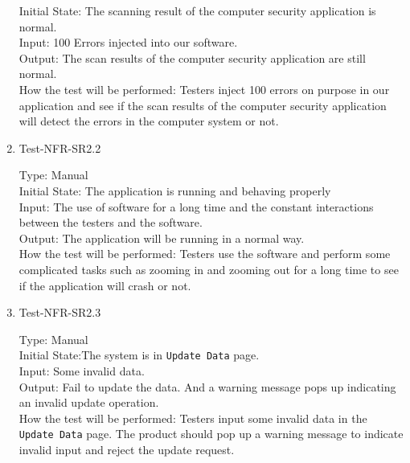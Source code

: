 \documentclass[12pt, titlepage]{article}
\begin{document}
\begin{enumerate}
Initial State: The scanning result of the computer security application is normal. \\

Input: 100 Errors injected into our software.\\

Output: The scan results of the computer security application are still normal.\\

How the test will be performed: Testers inject 100 errors on purpose in our application and see if the scan results of the computer security application will detect the errors in the computer system or not.

\item{Test-NFR-SR2.2\\}

Type: Manual\\

Initial State: The application is running and behaving properly\\

Input: The use of software for a long time and the constant interactions between the testers and the software.\\

Output: The application will be running in a normal way.\\

How the test will be performed: Testers use the software and perform some complicated tasks such as zooming in and zooming out for a long time to see if the application will crash or not.

\item{Test-NFR-SR2.3\\}

Type: Manual\\

Initial State:The system is in \verb|Update Data| page.\\

Input: Some invalid data.\\

Output: Fail to update the data. And a warning message pops up indicating an invalid update operation.\\

How the test will be performed: Testers input some invalid data in the \verb|Update Data| page. The product should pop up a warning message to indicate invalid input and reject the update request.\\




\end{enumerate}
\end{document}
